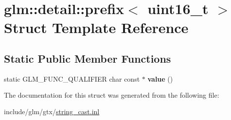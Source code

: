 \hypertarget{structglm_1_1detail_1_1prefix_3_01uint16__t_01_4}{}\section{glm\+:\+:detail\+:\+:prefix$<$ uint16\+\_\+t $>$ Struct Template Reference}
\label{structglm_1_1detail_1_1prefix_3_01uint16__t_01_4}
\subsection*{Static Public Member Functions}
\begin{DoxyCompactItemize}
\item 
\mbox{\label{structglm_1_1detail_1_1prefix_3_01uint16__t_01_4_a9546e8aaf707c3f0028c8da94f6c06da}} 
static G\+L\+M\+\_\+\+F\+U\+N\+C\+\_\+\+Q\+U\+A\+L\+I\+F\+I\+ER char const  $\ast$ {\bfseries value} ()
\end{DoxyCompactItemize}


The documentation for this struct was generated from the following file\+:\begin{DoxyCompactItemize}
\item 
include/glm/gtx/\hyperlink{string__cast_8inl}{string\+\_\+cast.\+inl}\end{DoxyCompactItemize}
